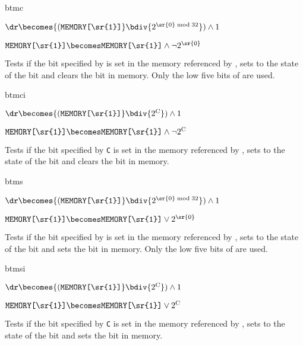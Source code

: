 \begin{instruction}{btmc}
    {$\dr \becomes {(\texttt{MEMORY[\sr{1}]}} \bdiv {2^{\sr{0} \bmod 32}}) \wedge  1$

     $\texttt{MEMORY[\sr{1}]} \becomes \texttt{MEMORY[\sr{1}]} \wedge \neg {2^{\textrm{\sr{0}}}}$}
    {
      Tests if the bit specified by  is set in the memory
      referenced by , sets \dr to the state of the bit and
      clears the bit in memory.  Only the low five bits of 
      are used.
    }
\end{instruction}


\begin{instruction}{btmci}
    {$\dr \becomes {(\texttt{MEMORY[\sr{1}]}} \bdiv {2^{\textrm{C}}}) \wedge  1$

     $\texttt{MEMORY[\sr{1}]} \becomes \texttt{MEMORY[\sr{1}]} \wedge \neg {2^{\textrm{C}}}$}
    {Tests if the bit specified by \texttt{C} is set in the memory
      referenced by , sets \dr to the state of the bit and
      clears the bit in memory.}
\end{instruction}


\begin{instruction}{btms}
    {$\dr \becomes {(\texttt{MEMORY[\sr{1}]}} \bdiv {2^{\sr{0} \bmod 32}}) \wedge  1$

     $\texttt{MEMORY[\sr{1}]} \becomes \texttt{MEMORY[\sr{1}]} \vee {2^{\textrm{\sr{0}}}}$}
    {Tests if the bit specified by  is set in the memory
      referenced by , sets \dr to the state of the bit and
      sets the bit in memory.  Only the low five bits of 
      are used.}
\end{instruction}


\begin{instruction}{btmsi}
    {$\dr \becomes {(\texttt{MEMORY[\sr{1}]}} \bdiv {2^{\textrm{C}}}) \wedge  1$

     $\texttt{MEMORY[\sr{1}]} \becomes \texttt{MEMORY[\sr{1}]} \vee {2^{\textrm{C}}}$}
    {Tests if the bit specified by \texttt{C} is set in the memory
      referenced by , sets \dr to the state of the bit and
      sets the bit in memory.}
\end{instruction}


%
%

